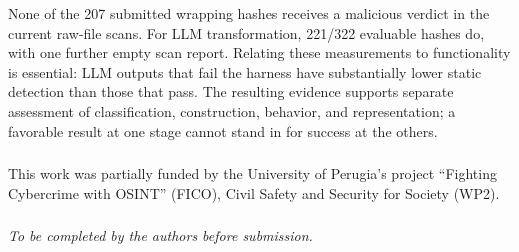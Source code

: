 \documentclass[runningheads]{llncs}
\begin{document}
None of the 207 submitted wrapping hashes receives a malicious verdict
in the current raw-file scans. For LLM transformation, 221/322 evaluable
hashes do, with one further empty scan report. Relating these measurements
to functionality is essential: LLM outputs that fail the harness have
substantially lower static detection than those that pass. The resulting
evidence supports separate assessment of classification, construction,
behavior, and representation; a favorable result at one stage cannot
stand in for success at the others.

\begin{credits}
\subsubsection{\ackname}
This work was partially funded by the University of Perugia's project ``Fighting Cybercrime with OSINT'' (FICO), Civil Safety and Security for Society (WP2).

\subsubsection{\discintname}
\emph{To be completed by the authors before submission.}
\end{credits}



\end{document}

